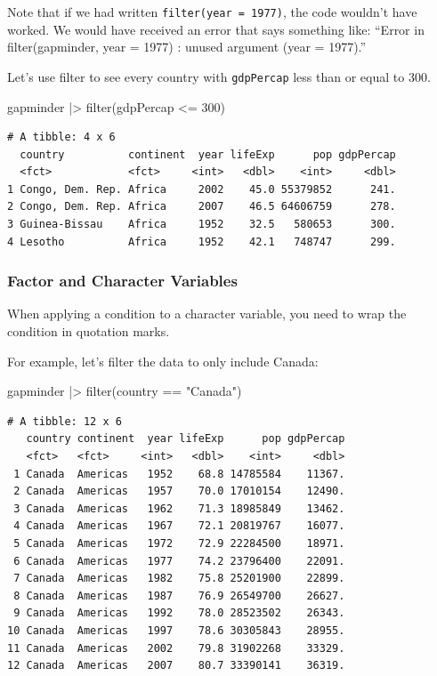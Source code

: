 \documentclass[
  letterpaper,
]{book}
\newenvironment{Shaded}{\begin{snugshade}}{\end{snugshade}}
\newcommand{\DecValTok}[1]{\textcolor[rgb]{0.68,0.00,0.00}{#1}}
\newcommand{\FunctionTok}[1]{\textcolor[rgb]{0.28,0.35,0.67}{#1}}
\newcommand{\NormalTok}[1]{\textcolor[rgb]{0.00,0.23,0.31}{#1}}
\newcommand{\SpecialCharTok}[1]{\textcolor[rgb]{0.37,0.37,0.37}{#1}}
\newcommand{\StringTok}[1]{\textcolor[rgb]{0.13,0.47,0.30}{#1}}
\begin{document}
Note that if we had written \texttt{filter(year\ =\ 1977)}, the code
wouldn't have worked. We would have received an error that says
something like: ``Error in filter(gapminder, year = 1977) : unused
argument (year = 1977).''

Let's use filter to see every country with \texttt{gdpPercap} less than
or equal to 300.

\begin{Shaded}
\begin{Highlighting}[]
\NormalTok{gapminder }\SpecialCharTok{|\textgreater{}} 
  \FunctionTok{filter}\NormalTok{(gdpPercap }\SpecialCharTok{\textless{}=} \DecValTok{300}\NormalTok{)}
\end{Highlighting}
\end{Shaded}

\begin{verbatim}
# A tibble: 4 x 6
  country          continent  year lifeExp      pop gdpPercap
  <fct>            <fct>     <int>   <dbl>    <int>     <dbl>
1 Congo, Dem. Rep. Africa     2002    45.0 55379852      241.
2 Congo, Dem. Rep. Africa     2007    46.5 64606759      278.
3 Guinea-Bissau    Africa     1952    32.5   580653      300.
4 Lesotho          Africa     1952    42.1   748747      299.
\end{verbatim}

\subsubsection{Factor and Character
Variables}\label{factor-and-character-variables}

When applying a condition to a character variable, you need to wrap the
condition in quotation marks.

For example, let's filter the data to only include Canada:

\begin{Shaded}
\begin{Highlighting}[]
\NormalTok{gapminder }\SpecialCharTok{|\textgreater{}} 
  \FunctionTok{filter}\NormalTok{(country }\SpecialCharTok{==} \StringTok{"Canada"}\NormalTok{)}
\end{Highlighting}
\end{Shaded}

\begin{verbatim}
# A tibble: 12 x 6
   country continent  year lifeExp      pop gdpPercap
   <fct>   <fct>     <int>   <dbl>    <int>     <dbl>
 1 Canada  Americas   1952    68.8 14785584    11367.
 2 Canada  Americas   1957    70.0 17010154    12490.
 3 Canada  Americas   1962    71.3 18985849    13462.
 4 Canada  Americas   1967    72.1 20819767    16077.
 5 Canada  Americas   1972    72.9 22284500    18971.
 6 Canada  Americas   1977    74.2 23796400    22091.
 7 Canada  Americas   1982    75.8 25201900    22899.
 8 Canada  Americas   1987    76.9 26549700    26627.
 9 Canada  Americas   1992    78.0 28523502    26343.
10 Canada  Americas   1997    78.6 30305843    28955.
11 Canada  Americas   2002    79.8 31902268    33329.
12 Canada  Americas   2007    80.7 33390141    36319.
\end{verbatim}
\end{document}
